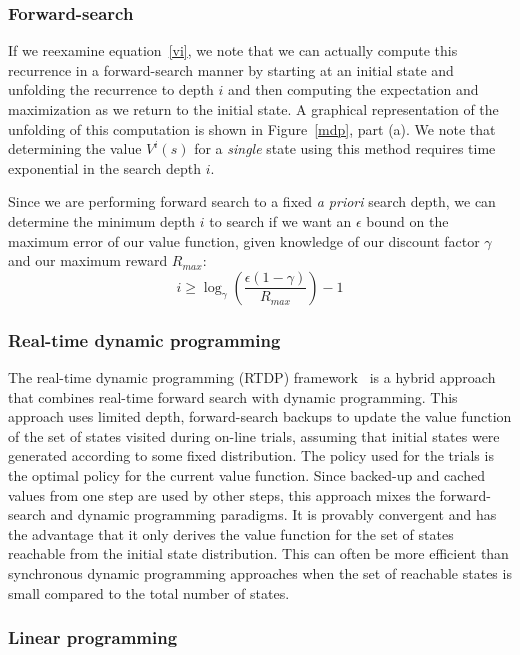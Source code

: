 \subsubsection{Forward-search}

If we reexamine equation~\ref{vi}, we note that we can actually compute this recurrence
in a forward-search manner by starting at an initial state and unfolding the recurrence to depth $i$
and then computing the expectation and maximization as we return to the initial state.  
A graphical representation of the unfolding of this computation is shown in Figure~\ref{mdp}, part (a).  
We note that determining the value $V^i(s)$ for a \emph{single}
state using this method requires time exponential in the search depth $i$. %

Since we are performing forward search to a fixed \emph{a priori} search depth, 
we can determine the minimum depth $i$ to search if we want an $\epsilon$ bound on the maximum error of
our value function, given knowledge of our discount factor $\gamma$ and our maximum reward $R_{max}$:
\begin{equation}
i \geq \log_{\gamma} \left( \frac{\epsilon (1 - \gamma)}{R_{max}} \right) - 1 
\end{equation}

\subsubsection{Real-time dynamic programming}

The real-time dynamic programming (RTDP) framework~\cite{rtdp} is a
hybrid approach that combines real-time forward search with 
dynamic programming.  This approach uses limited
depth, forward-search backups to update the value function of the set
of states visited during on-line trials, assuming that initial states
were generated according to some fixed distribution.   The policy used for the trials
is the optimal policy for the current value function.  Since backed-up and cached
values from one step are used by other steps, this approach
mixes the forward-search and dynamic programming paradigms.  It is
provably convergent and has the advantage that it only derives the
value function for the set of states reachable from the initial
state distribution.  This can often be more efficient than synchronous
dynamic programming approaches when the set of reachable states is
small compared to the total number of states.

\subsubsection{Linear programming}

